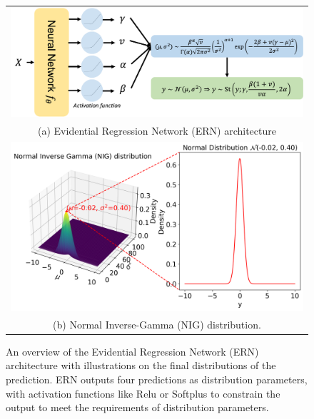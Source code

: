 


\begin{figure}
  \centering
  \begin{tabular}{c}
       \includegraphics[width=0.9\linewidth]{nig_framework.png}  \\
       (a) Evidential Regression Network (ERN) architecture \\
       \includegraphics[width=0.9\linewidth]{nig_distribution.png}  \\
       (b) Normal Inverse-Gamma (NIG) distribution.\\
  \end{tabular}
  \caption{ An overview of the Evidential Regression Network (ERN) architecture with illustrations on the final distributions of the prediction. ERN outputs four predictions as distribution parameters, with activation functions like Relu or Softplus to constrain the output to meet the requirements of distribution parameters.}
  \label{uncertainty_framework}
\end{figure}


